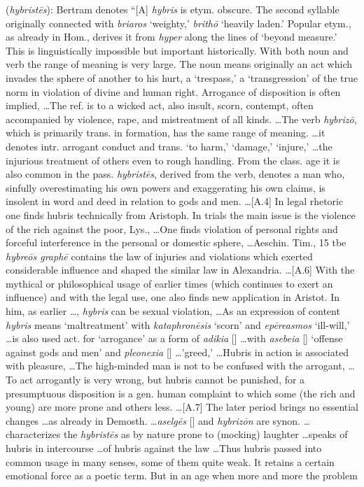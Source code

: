 \item[Hubris,]

(\textit{hybristēs}):
Bertram denotes ``[A] \emph{hybris} is etym. obscure. The second syllable originally connected with \emph{briaros} `weighty,' \emph{brithō} `heavily laden.' Popular etym., as already in Hom., derives it from \emph{hyper} along the lines of `beyond measure.' This is linguistically impossible but important historically. With both noun and verb the range of meaning is very large. The noun means originally an act which invades the sphere of another to his hurt, a `trespass,' a `transgression' of the true norm in violation of divine and human right. Arrogance of disposition is often implied, \ldots The ref. is to a wicked act, also insult, scorn, contempt, often accompanied by violence, rape, and mistreatment of all kinds. \ldots The verb \emph{hybrizō}, which is primarily trans. in formation, has the same range of meaning. \ldots it denotes intr. arrogant conduct and trans. `to harm,' `damage,' `injure,' \ldots the injurious treatment of others even to rough handling. From the class. age it is also common in the pass. \emph{hybristēs}, derived from the verb, denotes a man who, sinfully overestimating his own powers and exaggerating his own claims, is insolent in word and deed in relation to gods and men. \ldots [A.4] In legal rhetoric one finds hubris technically from Aristoph. In trials the main issue is the violence of the rich against the poor, Lys., \ldots One finds violation of personal rights and forceful interference in the personal or domestic sphere, \ldots Aeschin. Tim., 15 tbe \emph{hybreōs graphē} contains the law of injuries and violations which exerted considerable influence and shaped the similar law in Alexandria. \ldots [A.6] With the mythical or philosophical usage of earlier times  (which continues to exert an influence) and with the legal use, one also finds new application in Aristot. In him, as earlier \ldots, \emph{hybris} can be sexual violation, \ldots As an expression of content \emph{hybris} means `maltreatment' with \emph{kataphronēsis} `scorn' and \emph{epēreasmos} `ill-will,' \ldots is also used act. for `arrogance' as a form of \emph{adikia} [] \ldots with \emph{asebeia} [] `offense against gods and men' and \emph{pleonexia} [] \ldots 'greed,' \ldots Hubris in action is associated with pleasure, \ldots The high-minded man is not to be confused with the arrogant, \ldots To act arrogantly is very wrong, but hubris cannot be punished, for a presumptuous disposition is a gen. human complaint to which some  (the rich and young) are more prone and others less. \ldots [A.7] The later period brings no essential changes \ldots as already in Demosth. \ldots \emph{aselgēs} [] and \emph{hybrizōn} are synon. \ldots characterizes the \emph{hybristēs} as by nature prone to (mocking) laughter \ldots speaks of hubris in intercourse \ldots of hubris against the law \ldots Thus hubris passed into common usage in many senses, some of them quite weak. It retains a certain emotional force as a poetic term. But in an age when more and more the problem 